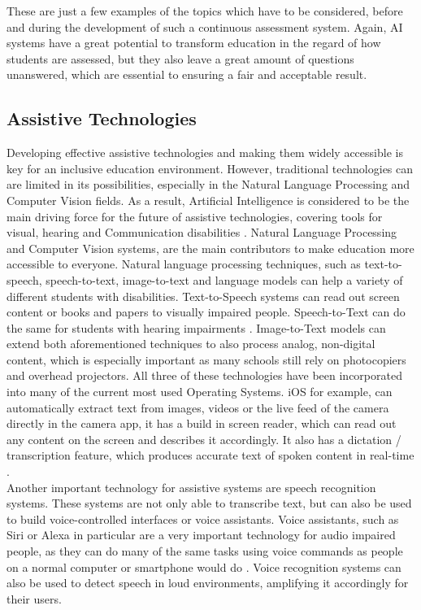 \documentclass{Academic}
\begin{document}
    These are just a few examples of the topics which have to be considered, before and during the development of such a continuous assessment system. Again, AI systems have a great potential to transform education in the regard of how students are assessed, but they also leave a great amount of questions unanswered, which are essential to ensuring a fair and acceptable result.

    \subsection{Assistive Technologies}
    Developing effective assistive technologies and making them widely accessible is key for an inclusive education environment. However, traditional technologies can are limited in its possibilities, especially in the Natural Language Processing and Computer Vision fields. As a result, Artificial Intelligence is considered to be the main driving force for the future of assistive technologies, covering tools for visual, hearing and Communication disabilities \cite{zdravkova_potential_2022}. Natural Language Processing and Computer Vision systems, are the main contributors to make education more accessible to everyone. Natural language processing techniques, such as text-to-speech, speech-to-text, image-to-text and language models can help a variety of different students with disabilities. Text-to-Speech systems can read out screen content or books and papers to visually impaired people. Speech-to-Text can do the same for students with hearing impairments \cite{zdravkova_potential_2022}. Image-to-Text models can extend both aforementioned techniques to also process analog, non-digital content, which is especially important as many schools still rely on photocopiers and overhead projectors. All three of these technologies have been incorporated into many of the current most used Operating Systems. iOS for example, can automatically extract text from images, videos or the live feed of the camera directly in the camera app, it has a build in screen reader, which can read out any content on the screen and describes it accordingly. It also has a dictation / transcription feature, which produces accurate text of spoken content in real-time \cite{zdravkova_potential_2022}.\\
    Another important technology for assistive systems are speech recognition systems. These systems are not only able to transcribe text, but can also be used to build voice-controlled interfaces or voice assistants. Voice assistants, such as Siri or Alexa in particular are a very important technology for audio impaired people, as they can do many of the same tasks using voice commands as people on a normal computer or smartphone would do \cite{zdravkova_potential_2022}. Voice recognition systems can also be used to detect speech in loud environments, amplifying it accordingly for their users.\\
\end{document}
